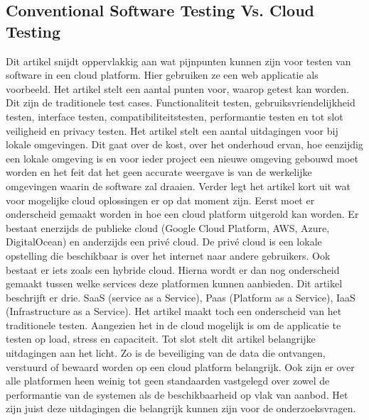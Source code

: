\subsection{Conventional Software Testing Vs. Cloud Testing}
Dit artikel \autocite{CSTVCT} snijdt oppervlakkig aan wat pijnpunten kunnen zijn voor testen van software in een cloud platform. Hier gebruiken ze een web applicatie als voorbeeld. Het artikel stelt een aantal punten voor, waarop getest kan worden. Dit zijn de traditionele test cases. Functionaliteit testen, gebruiksvriendelijkheid testen, interface testen, compatibiliteitstesten, performantie testen en tot slot veiligheid en privacy testen. Het artikel stelt een aantal uitdagingen voor bij lokale omgevingen. Dit gaat over de kost, over het onderhoud ervan, hoe eenzijdig een lokale omgeving is en voor ieder project een nieuwe omgeving gebouwd moet worden en het feit dat het geen accurate weergave is van de werkelijke omgevingen waarin de software zal draaien.
\newline
\newline
Verder legt het artikel kort uit wat voor mogelijke cloud oplossingen er op dat moment zijn. Eerst moet er onderscheid gemaakt worden in hoe een cloud platform uitgerold kan worden. Er bestaat enerzijds de publieke cloud (Google Cloud Platform, AWS, Azure, DigitalOcean) en anderzijds een privé cloud. De privé cloud is een lokale opstelling die beschikbaar is over het internet naar andere gebruikers. Ook bestaat er iets zoals een hybride cloud. Hierna wordt er dan nog onderscheid gemaakt tussen welke services deze platformen kunnen aanbieden. Dit artikel beschrijft er drie. SaaS (service as a Service), Paas (Platform as a Service), IaaS (Infrastructure as a Service). Het artikel maakt toch een onderscheid van het traditionele testen. Aangezien het in de cloud mogelijk is om de applicatie te testen op load, stress en capaciteit.
\newline
\newline
Tot slot stelt dit artikel belangrijke uitdagingen aan het licht. Zo is de beveiliging van de data die ontvangen, verstuurd of bewaard worden op een cloud platform belangrijk. Ook zijn er over alle platformen heen weinig tot geen standaarden vastgelegd over zowel de performantie van de systemen als de beschikbaarheid op vlak van aanbod. Het zijn juist deze uitdagingen die belangrijk kunnen zijn voor de onderzoeksvragen.

